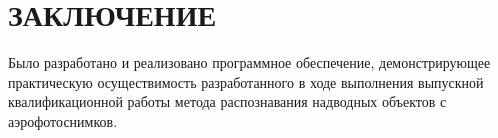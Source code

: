 \chapter*{ЗАКЛЮЧЕНИЕ}

Было разработано и реализовано программное обеспечение, демонстрирующее практическую осуществимость разработанного в ходе выполнения выпускной квалификационной работы метода распознавания надводных объектов с аэрофотоснимков.